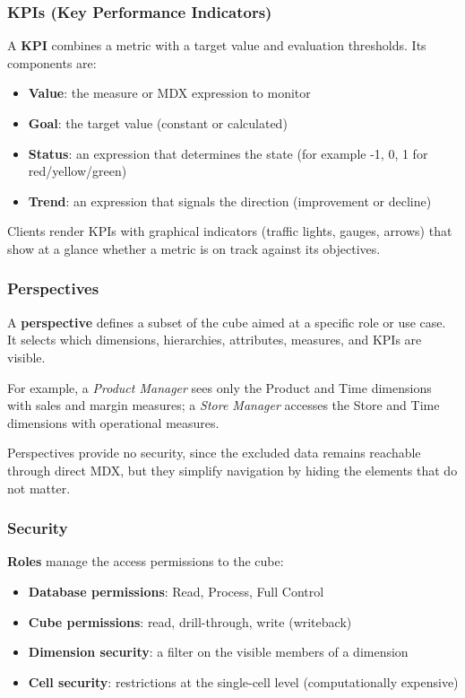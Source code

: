 \subsubsection{KPIs (Key Performance Indicators)}
\label{subsec:kpi}

A \textbf{KPI} combines a metric with a target value and evaluation thresholds. Its components are:
\begin{itemize}
    \item \textbf{Value}: the measure or MDX expression to monitor
    \item \textbf{Goal}: the target value (constant or calculated)
    \item \textbf{Status}: an expression that determines the state (for example -1, 0, 1 for red/yellow/green)
    \item \textbf{Trend}: an expression that signals the direction (improvement or decline)
\end{itemize}

Clients render KPIs with graphical indicators (traffic lights, gauges, arrows) that show at a glance whether a metric is on track against its objectives.

\subsubsection{Perspectives}
\label{subsec:perspectives}

A \textbf{perspective} defines a subset of the cube aimed at a specific role or use case. It selects which dimensions, hierarchies, attributes, measures, and KPIs are visible.

For example, a \textit{Product Manager} sees only the Product and Time dimensions with sales and margin measures; a \textit{Store Manager} accesses the Store and Time dimensions with operational measures.

Perspectives provide no security, since the excluded data remains reachable through direct MDX, but they simplify navigation by hiding the elements that do not matter.

\subsubsection{Security}
\label{subsec:ssas-security}

\textbf{Roles} manage the access permissions to the cube:
\begin{itemize}
    \item \textbf{Database permissions}: Read, Process, Full Control
    \item \textbf{Cube permissions}: read, drill-through, write (writeback)
    \item \textbf{Dimension security}: a filter on the visible members of a dimension
    \item \textbf{Cell security}: restrictions at the single-cell level (computationally expensive)
\end{itemize}

